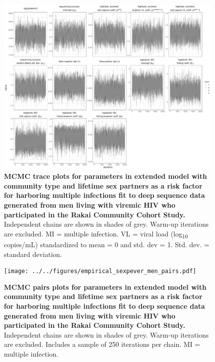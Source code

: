 \documentclass[10pt,letterpaper]{article}
\begin{document}
\begin{figure}[!ht]
 \includegraphics[width=1\textwidth]{../../figures/empirical_sexpever_men_trace.pdf}
\caption{{\bf MCMC trace plots for parameters in extended model with community type and lifetime sex partners as a risk factor for harboring multiple infections fit to deep sequence data generated from  men living with viremic HIV who participated in the Rakai Community Cohort Study.} Independent chains are shown in shades of grey. Warm-up iterations are excluded. MI = multiple infection. VL = viral load (log\textsubscript{10} copies/mL) standardized to mean = 0 and std. dev = 1. Std. dev. = standard deviation.}
\end{figure}

\begin{figure}[!ht]
 \texttt{[image: ../../figures/empirical\_sexpever\_men\_pairs.pdf]}
\caption{{\bf MCMC  pairs plots for parameters in extended model with community type and lifetime sex partners as a risk factor for harboring multiple infections fit to deep sequence data generated from  men living with viremic HIV who participated in the Rakai Community Cohort Study.} Independent chains are shown in shades of grey. Warm-up iterations are excluded. Includes a sample of 250 iterations per chain. MI = multiple infection. }
\end{figure}
\end{document}
